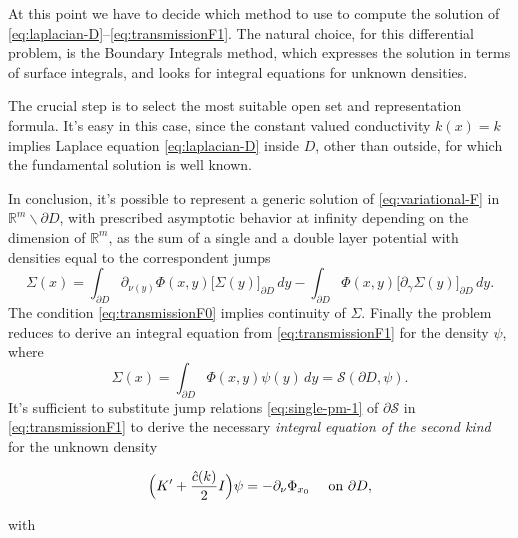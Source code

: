 \documentclass[10pt, a4paper, twoside, openright]{book}
\theoremstyle{definition}
\theoremstyle{plain}
\theoremstyle{plain}
\theoremstyle{plain}
\theoremstyle{plain}
\theoremstyle{plain}
\theoremstyle{plain}
\theoremstyle{plain}
\theoremstyle{plain}
\begin{document}
At this point we have to decide which method to use to compute the solution of \eqref{eq:laplacian-D}--\eqref{eq:transmissionF1}. The natural choice, for this differential problem, is the Boundary Integrals method, which expresses the solution in terms of surface integrals, and looks for integral equations for unknown densities. 
\par
The crucial step is to select the most suitable open set and representation formula. It's easy in this case, since the constant valued conductivity $k(x)=k$ implies Laplace equation \eqref{eq:laplacian-D} inside $D$, other than outside, for which the fundamental solution is well known.
\par
In conclusion, it's possible to represent a generic solution of \eqref{eq:variational-F} 
in $\mathbb{R}^m\backslash\partial D$, with prescribed asymptotic behavior at infinity depending on the dimension of $\mathbb{R}^m$, as the sum of a single and a double layer potential with densities equal to the correspondent jumps 
\begin{equation}
 \Sigma(x) = \int_{\partial D}\partial_{\nu(y)}\Phi(x,y)\bigl[\Sigma(y)\bigr]_{\partial D}\,dy-\int_{\partial D}\Phi(x,y)\bigl[\partial_\gamma \Sigma(y)\bigr]_{\partial D}\,dy.
\end{equation}
The condition \eqref{eq:transmissionF0} implies continuity of $\Sigma$. Finally the problem reduces to derive an integral equation from \eqref{eq:transmissionF1} for the density $\psi$, where
\begin{equation}
 \Sigma(x)=\int_{\partial D}\Phi(x,y)\psi(y)\,dy = \mathcal{S}(\partial D, \psi).
\end{equation}
It's sufficient to substitute jump relations \eqref{eq:single-pm-1} of $\partial\mathcal{S}$ in \eqref{eq:transmissionF1} to derive the necessary \emph{integral equation of the second kind} for the unknown density
\begin{center}
\begin{equation}
 \label{eq:eq-psi-ck}
 \Bigl(K' + \frac{\hat{c}(k)}{2} I\Bigr)\psi = -\partial_\nu \Phi_{x_0}\quad\textup{ on }\partial D,
\end{equation}
\end{center}
with 
\end{document}
